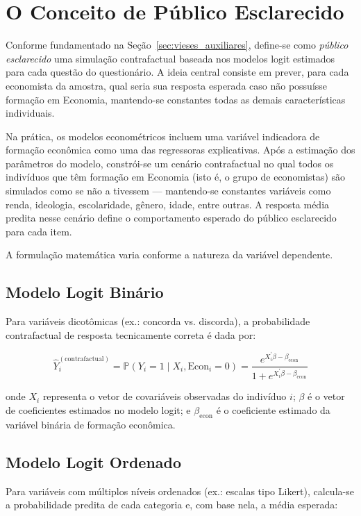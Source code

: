 \section{O Conceito de Público Esclarecido}
\label{sec:publico_esclarecido}

Conforme fundamentado na Seção~\ref{sec:vieses_auxiliares}, define-se como \textit{público esclarecido} uma simulação contrafactual baseada nos modelos logit estimados para cada questão do questionário. A ideia central consiste em prever, para cada economista da amostra, qual seria sua resposta esperada caso não possuísse formação em Economia, mantendo-se constantes todas as demais características individuais.

Na prática, os modelos econométricos incluem uma variável indicadora de formação econômica como uma das regressoras explicativas. Após a estimação dos parâmetros do modelo, constrói-se um cenário contrafactual no qual todos os indivíduos que têm formação em Economia (isto é, o grupo de economistas) são simulados como se não a tivessem — mantendo-se constantes variáveis como renda, ideologia, escolaridade, gênero, idade, entre outras. A resposta média predita nesse cenário define o comportamento esperado do público esclarecido para cada item.

A formulação matemática varia conforme a natureza da variável dependente.

\subsection{Modelo Logit Binário}

Para variáveis dicotômicas (ex.: concorda vs. discorda), a probabilidade contrafactual de resposta tecnicamente correta é dada por:

\[
\hat{Y}_i^{(\text{contrafactual})} = \mathbb{P}(Y_i = 1 \mid X_i, \text{Econ}_i = 0) = \frac{e^{X_i^\prime \beta - \beta_{\text{econ}}}}{1 + e^{X_i^\prime \beta - \beta_{\text{econ}}}}
\]

\noindent onde $X_i$ representa o vetor de covariáveis observadas do indivíduo $i$; $\beta$ é o vetor de coeficientes estimados no modelo logit; e $\beta_{\text{econ}}$ é o coeficiente estimado da variável binária de formação econômica.

\subsection{Modelo Logit Ordenado}

Para variáveis com múltiplos níveis ordenados (ex.: escalas tipo Likert), calcula-se a probabilidade predita de cada categoria e, com base nela, a média esperada:

